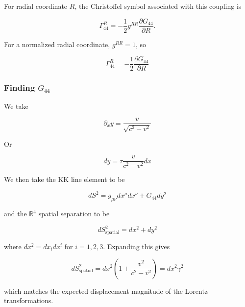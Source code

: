 \documentclass[pdflatex,sn-mathphys-num]{sn-jnl}%
\theoremstyle{thmstyleone}%
\theoremstyle{thmstyletwo}%
\theoremstyle{thmstylethree}%
\begin{document}
For radial coordinate $R$, the Christoffel symbol associated with this coupling is

\begin{equation}
    \Gamma^R_{44}
    =
    -\frac{1}{2}g^{RR}
    \frac{\partial G_{44}}{\partial R}.
\end{equation}

For a normalized radial coordinate, $g^{RR}=1$, so

\begin{equation}
    \boxed{
        \Gamma^R_{44}
        =
        -\frac{1}{2}
        \frac{\partial G_{44}}{\partial R}
    }
    \label{eq_radial_christoffel}
\end{equation}

\subsubsection{Finding $G_{44}$}

We take

\begin{equation}\label{eq_partial_x_of_y}
    \partial_x y = \frac{v}{\sqrt{c^{2} - v^{2}}}
\end{equation}

Or

\begin{equation}
    dy = \tau \frac{v}{c^{2} - v^{2}} dx
\end{equation}

We then take the KK line element to be 

\begin{equation}\label{eq_line_element_definition}
    dS^{2} = g_{\mu \nu} dx^{\mu} dx^{\nu} + G_{44}dy^{2}
\end{equation}

and the $\mathbb{R}^{4}$ spatial separation to be

\begin{equation}
    dS^{2}_{\text{spatial}} = dx^{2} + dy^{2}
\end{equation}

where $dx^{2} = dx_i dx^{i}$ for $i = 1, 2, 3$. Expanding this gives

\begin{equation}
    dS^{2}_{\text{spatial}} = dx^{2} \left( 1 + \frac{v^{2}}{c^{2} - v^{2}} \right) = dx^{2} \gamma^{2}
\end{equation}

which matches the expected displacement magnitude of the Lorentz transformations.
\end{document}
